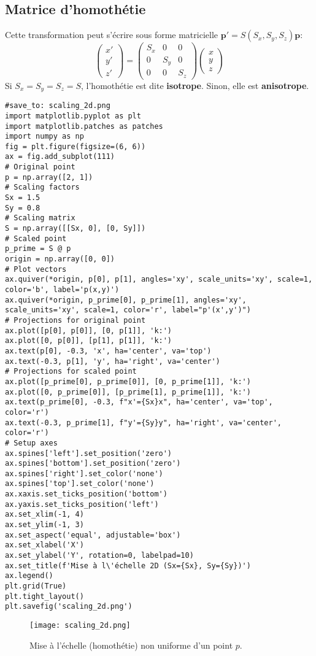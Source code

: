 \subsection{Matrice d'homothétie}
Cette transformation peut s'écrire sous forme matricielle \( \mathbf{p'} = S(S_x, S_y, S_z) \mathbf{p} \):
\[ \begin{pmatrix} x' \\ y' \\ z' \end{pmatrix} = \begin{pmatrix} S_x & 0 & 0 \\ 0 & S_y & 0 \\ 0 & 0 & S_z \end{pmatrix} \begin{pmatrix} x \\ y \\ z \end{pmatrix} \]
Si \( S_x = S_y = S_z = S \), l'homothétie est dite \textbf{isotrope}. Sinon, elle est \textbf{anisotrope}.
\begin{verbatim}
#save_to: scaling_2d.png
import matplotlib.pyplot as plt
import matplotlib.patches as patches
import numpy as np
fig = plt.figure(figsize=(6, 6))
ax = fig.add_subplot(111)
# Original point
p = np.array([2, 1])
# Scaling factors
Sx = 1.5
Sy = 0.8
# Scaling matrix
S = np.array([[Sx, 0], [0, Sy]])
# Scaled point
p_prime = S @ p
origin = np.array([0, 0])
# Plot vectors
ax.quiver(*origin, p[0], p[1], angles='xy', scale_units='xy', scale=1, color='b', label='p(x,y)')
ax.quiver(*origin, p_prime[0], p_prime[1], angles='xy', scale_units='xy', scale=1, color='r', label="p'(x',y')")
# Projections for original point
ax.plot([p[0], p[0]], [0, p[1]], 'k:')
ax.plot([0, p[0]], [p[1], p[1]], 'k:')
ax.text(p[0], -0.3, 'x', ha='center', va='top')
ax.text(-0.3, p[1], 'y', ha='right', va='center')
# Projections for scaled point
ax.plot([p_prime[0], p_prime[0]], [0, p_prime[1]], 'k:')
ax.plot([0, p_prime[0]], [p_prime[1], p_prime[1]], 'k:')
ax.text(p_prime[0], -0.3, f"x'={Sx}x", ha='center', va='top', color='r')
ax.text(-0.3, p_prime[1], f"y'={Sy}y", ha='right', va='center', color='r')
# Setup axes
ax.spines['left'].set_position('zero')
ax.spines['bottom'].set_position('zero')
ax.spines['right'].set_color('none')
ax.spines['top'].set_color('none')
ax.xaxis.set_ticks_position('bottom')
ax.yaxis.set_ticks_position('left')
ax.set_xlim(-1, 4)
ax.set_ylim(-1, 3)
ax.set_aspect('equal', adjustable='box')
ax.set_xlabel('X')
ax.set_ylabel('Y', rotation=0, labelpad=10)
ax.set_title(f'Mise à l\'échelle 2D (Sx={Sx}, Sy={Sy})')
ax.legend()
plt.grid(True)
plt.tight_layout()
plt.savefig('scaling_2d.png')
\end{verbatim}
\begin{figure}[H]
\centering
\texttt{[image: scaling\_2d.png]}
\caption{Mise à l'échelle (homothétie) non uniforme d'un point \( p \).}
\label{fig:scaling_2d}
\end{figure}
